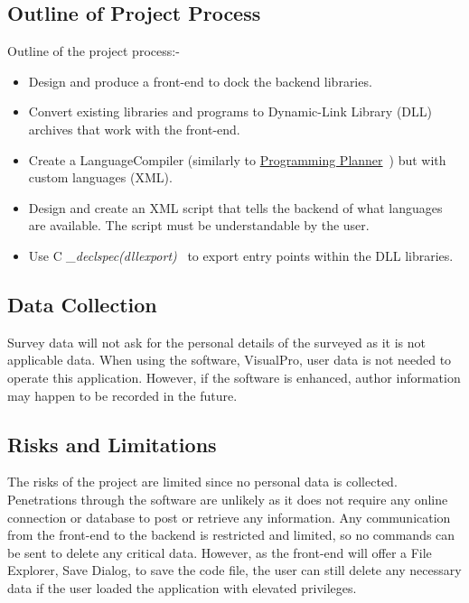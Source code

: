 \documentclass[conference]{IEEEtran}
\begin{document}
      \subsection{Outline of Project Process}
        Outline of the project process:-
        \begin{itemize}
          \item Design and produce a front-end to dock the backend libraries.
          \item Convert existing libraries and programs to Dynamic-Link Library (DLL) archives that work with the front-end.
          \item Create a LanguageCompiler (similarly to \href{https://github.com/ShinkuKira21/VisualPro-FinalProject/tree/main/Experience}{Programming Planner}~\cite{patch_programming_2021}) but with custom languages (XML).
          \item Design and create an XML script that tells the backend of what languages are available. The script must be understandable by the user.
          \item Use C \textit{\_declspec(dllexport)}~\cite{microsoft_exporting_2019} to export entry points within the DLL libraries.
        \end{itemize}
        
      \subsection{Data Collection}
        Survey data will not ask for the personal details of the surveyed as it is not applicable data. When using the software, VisualPro, user data is not needed to operate this application. However, if the software is enhanced, author information may happen to be recorded in the future.

      \subsection{Risks and Limitations}
        The risks of the project are limited since no personal data is collected. Penetrations through the software are unlikely as it does not require any online connection or database to post or retrieve any information. Any communication from the front-end to the backend is restricted and limited, so no commands can be sent to delete any critical data. However, as the front-end will offer a File Explorer, Save Dialog, to save the code file, the user can still delete any necessary data if the user loaded the application with elevated privileges.
\end{document}

